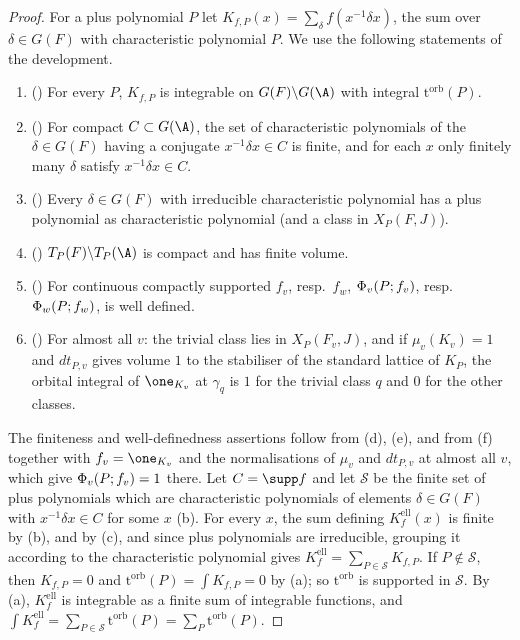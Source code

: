 \begin{proof}
For a plus polynomial $P$ let $K_{f,P}(x)=\sum_{\delta}f(x^{-1}\delta x)$, the sum over $\delta\in G(F)$ with
characteristic polynomial $P$. We use the following statements of the development.
\begin{enumerate}[label=(\alph*)]
\item () For every $P$, $K_{f,P}$ is
integrable on $G(F)\backslash G(\A)$ with integral $\mathrm{t}^{\mathrm{orb}}(P)$.
\item () For compact $C\subset G(\A)$, the set of characteristic
polynomials of the $\delta\in G(F)$ having a conjugate $x^{-1}\delta x\in C$ is finite, and for each $x$ only finitely many
$\delta$ satisfy $x^{-1}\delta x\in C$.
\item () Every $\delta\in G(F)$ with irreducible
characteristic polynomial has a plus polynomial as characteristic polynomial (and a class in $X_P(F,J)$).
\item () $T_P(F)\backslash T_P(\A)$ is compact and has
finite volume.
\item () For continuous compactly supported $f_v$, resp.\
$f_w$, $\Phi_v(P;f_v)$, resp.\ $\Phi_w(P;f_w)$, is well defined.
\item () For almost all $v$: the trivial class
lies in $X_P(F_v,J)$, and if $\mu_v(K_v)=1$ and $dt_{P,v}$ gives volume $1$ to the stabiliser of the standard lattice of
$K_P$, the orbital integral of $\one_{K_v}$ at $\gamma_q$ is $1$ for the trivial class $q$ and $0$ for the other classes.
\end{enumerate}
The finiteness and well-definedness assertions follow from (d), (e), and from (f) together with $f_v=\one_{K_v}$ and the
normalisations of $\mu_v$ and $dt_{P,v}$ at almost all $v$, which give $\Phi_v(P;f_v)=1$ there. Let $C=\supp f$ and let
$\mathcal S$ be the finite set of plus polynomials which are characteristic polynomials of elements $\delta\in G(F)$ with
$x^{-1}\delta x\in C$ for some $x$ (b). For every $x$, the sum defining $K^{\mathrm{ell}}_f(x)$ is finite by (b), and by (c),
and since plus polynomials are irreducible, grouping it according to the characteristic polynomial gives
$K^{\mathrm{ell}}_f=\sum_{P\in\mathcal S}K_{f,P}$. If $P\notin\mathcal S$, then $K_{f,P}=0$ and $\mathrm{t}^{\mathrm{orb}}(P)=
\int K_{f,P}=0$ by (a); so $\mathrm{t}^{\mathrm{orb}}$ is supported in $\mathcal S$. By (a), $K^{\mathrm{ell}}_f$ is integrable
as a finite sum of integrable functions, and $\int K^{\mathrm{ell}}_f=\sum_{P\in\mathcal S}\mathrm{t}^{\mathrm{orb}}(P)=\sum_P
\mathrm{t}^{\mathrm{orb}}(P)$.
\end{proof}

